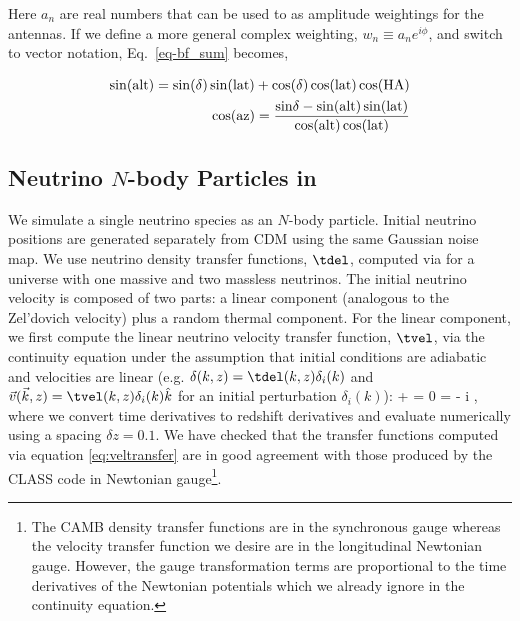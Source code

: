 \noindent Here $a_n$ are real numbers that can be used to as 
amplitude weightings for the antennas. If we define a more 
general complex weighting, $w_n \equiv a_n e^{i\phi}$, and 
switch to vector notation, Eq.~\ref{eq-bf_sum} becomes,



\begin{align}
\rm{sin}(alt) = \rm{sin}(\delta)\, \rm{sin}(lat) + cos(\delta)\, cos(lat)\, cos(\rm HA)\\
\rm{cos}(az) = \frac{\rm{sin}\delta - \rm{sin}(alt) \,
\rm{sin}(lat)}{\rm{cos}(alt)\, \rm{cos}(lat)}
\end{align}

\subsection{Neutrino $N$-body Particles in \cpm{}}
\label{}

We simulate a single neutrino species as an $N$-body particle. Initial neutrino positions are generated separately from CDM using the same Gaussian noise map. We use neutrino density transfer functions, $\tdel$, computed via \camb{} \citep{lewis/etal:2000} for a universe with one massive and two massless neutrinos. The initial neutrino velocity is composed of two parts: a linear component (analogous to the Zel'dovich velocity) plus a random thermal component.  For the linear component, we first compute the linear neutrino velocity transfer function, $\tvel$, via the continuity equation under the assumption that initial conditions are adiabatic and velocities are linear (e.g. $\delta(k,z) = \tdel(k,z) \delta_i(k)$ and $\vec{v}(\vec{k},z) = \tvel(k,z) \delta_i(k) \hat{k}$ for an initial perturbation $\delta_i(k)$):
\bq
\dot{\delta} + \vec{\nabla}\cdot{} = 0 \rightarrow \tvel = - i  ,
\label{eq:veltransfer}
\eq
where we convert time derivatives to redshift derivatives and evaluate numerically using a spacing $\delta z = 0.1$. We have checked that the transfer functions computed via equation \ref{eq:veltransfer} are in good agreement with those produced by the {\small CLASS} code \citep{blas/etal:2011} in Newtonian gauge\footnote{The {\small CAMB} density transfer functions are in the synchronous gauge whereas the velocity transfer function we desire are in the longitudinal Newtonian gauge.  However, the gauge transformation terms are proportional to the time derivatives of the Newtonian potentials which we already ignore in the continuity equation.}.  
  
